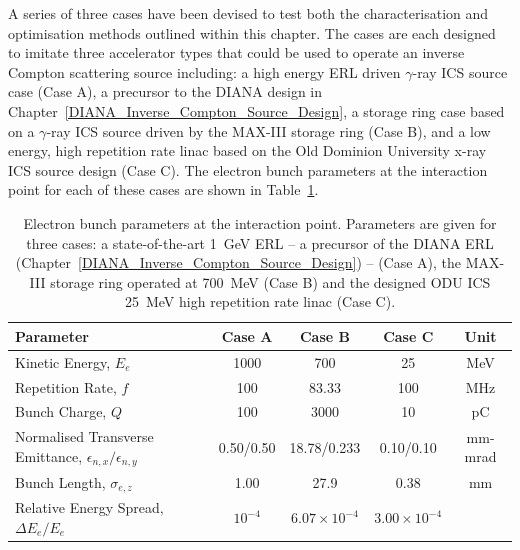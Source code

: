 \documentclass[../main.tex]{subfiles}
\begin{document}
A series of three cases have been devised to test both the characterisation and optimisation methods outlined within this chapter. The cases are each designed to imitate three accelerator types that could be used to operate an inverse Compton scattering source including: a high energy ERL driven $\gamma$-ray ICS source case (Case A), a precursor to the DIANA design in Chapter~\ref{DIANA_Inverse_Compton_Source_Design}, a storage ring case based on a $\gamma$-ray ICS source driven by the MAX-III storage ring  \cite{owen2013nonequilibrium} (Case B), and a low energy, high repetition rate linac based on the Old Dominion University x-ray ICS source design \cite{krafft2016laser,deitrick2017inverse,deitrick2018high} (Case C). The electron bunch parameters at the interaction point for each of these cases are shown in Table~\ref{tab:char_opt_electron_bunch_parameters}.

\begin{table}[!h]
\centering
\caption{Electron bunch parameters at the interaction point. Parameters are given for three cases: a state-of-the-art 1~\si{\giga\electronvolt} ERL -- a precursor of the DIANA ERL (Chapter~\ref{DIANA_Inverse_Compton_Source_Design}) -- (Case A), the MAX-III storage ring operated at 700~\si{\mega\electronvolt} \cite{sjostrom2009max,hansson2011imaging,rosborg2012electron} (Case B) and the designed ODU ICS 25~\si{\mega\electronvolt} high repetition rate linac \cite{krafft2016laser,deitrick2017inverse,deitrick2018high} (Case C).}
\label{tab:char_opt_electron_bunch_parameters}
\begin{tabular}{lcccc}
\hline\hline
Parameter & Case A & Case B & Case C & Unit \\
\hline
Kinetic Energy, $E_{e}$ & 1000 & 700 & 25 & \si{\mega\electronvolt} \\
Repetition Rate, $f$ & 100 & 83.33 & 100 & \si{\mega\hertz} \\
Bunch Charge, $Q$ & 100 & 3000 & 10 & \si{\pico\coulomb} \\
Normalised Transverse Emittance, $\epsilon_{n,x}/\epsilon_{n,y}$ & 0.50/0.50 & 18.78/0.233 & 0.10/0.10 & \si{\milli\meter}-\si{\milli\radian} \\
Bunch Length, $\sigma_{e,z}$ & 1.00 & 27.9 & 0.38 & \si{\milli\meter} \\
Relative Energy Spread, $\Delta E_{e}/E_{e}$ & $10^{-4}$ & $6.07\times 10^{-4}$ & $3.00\times 10^{-4}$ & \\
\hline\hline
\end{tabular}
\label{tab:char_opt_electron_bunch_parameters}
\end{table}
\end{document}
